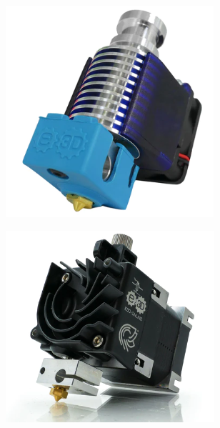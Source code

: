 \documentclass[12pt, english]{article}
\begin{document}
\begin{figure}[H]
	\centering
	\begin{minipage}{.5\textwidth}
		\centering
		\includegraphics[height=.8\linewidth]{V6.png}
		\label{fig:v6}
	\end{minipage}%
	\begin{minipage}{.5\textwidth}
		\centering
		\includegraphics[height=.8\linewidth]{Hemera.png}
		\label{fig:hemera}
	\end{minipage}
\end{figure}
\end{document}
